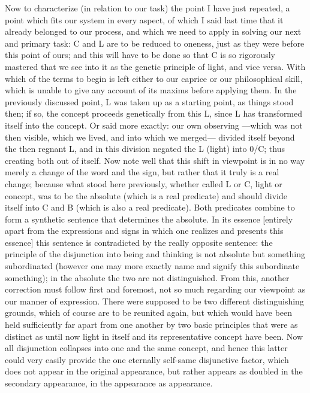Now to characterize (in relation to our task)
the point I have just repeated,
a point which fits our system in every aspect,
of which I said last time that
it already belonged to our process,
and which we need to apply in solving
our next and primary task:
C and L are to be reduced to oneness,
just as they were before this point of ours;
and this will have to be done so that C is
so rigorously mastered that we see into it
as the genetic principle of light, and vice versa.
With which of the terms to begin is left either to our caprice or
our philosophical skill,
which is unable to give any account of its maxims before applying them.
In the previously discussed point,
L was taken up as a starting point,
as things stood then;
if so, the concept proceeds genetically from this L,
since L has transformed itself into the concept.
Or said more exactly:
our own observing
—which was not then visible, which we
lived, and into which we merged—
divided itself beyond the then regnant L,
and in this division negated the L (light) into 0/C;
thus creating both out of itself.
Now note well that this shift in viewpoint is
in no way merely a change of the word and the sign,
but rather that it truly is a real change;
because what stood here previously,
whether called L or C, light or concept,
was to be the absolute (which is a real predicate)
and should divide itself into C and B
(which is also a real predicate).
Both predicates combine to form
a synthetic sentence that determines the absolute.
In its essence
[entirely apart from the expressions and signs
in which one realizes and presents this essence]
this sentence is contradicted
by the really opposite sentence:
the principle of the disjunction
into being and thinking is not absolute
but something subordinated
(however one may more exactly name and signify
this subordinate something);
in the absolute the two are not distinguished.
From this, another correction must follow first and foremost,
not so much regarding our viewpoint as our manner of expression.
There were supposed to be two different distinguishing grounds,
which of course are to be reunited again,
but which would have been held sufficiently
far apart from one another by two basic principles
that were as distinct as until now
light in itself and its representative concept have been.
Now all disjunction collapses into one and the same concept,
and hence this latter could very easily provide
the one eternally self-same disjunctive factor,
which does not appear in the original appearance,
but rather appears as doubled in the secondary appearance,
in the appearance as appearance.

